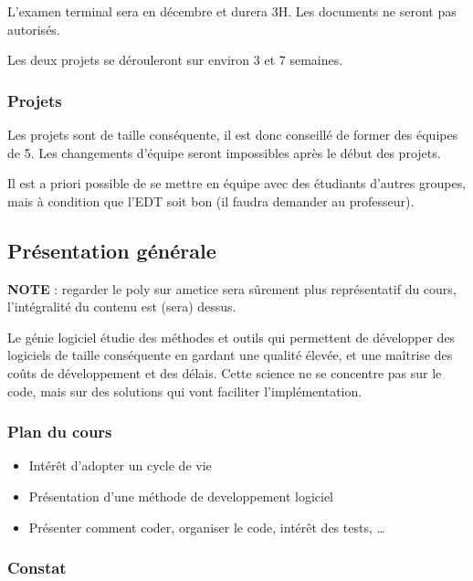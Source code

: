 L'examen terminal sera en décembre et durera 3H. Les documents ne seront
pas autorisés.

Les deux projets se dérouleront sur environ 3 et 7 semaines.

\hypertarget{projets}{%
\subsubsection{Projets}\label{projets}}

Les projets sont de taille conséquente, il est donc conseillé de former
des équipes de 5. Les changements d'équipe seront impossibles après le
début des projets.

Il est a priori possible de se mettre en équipe avec des étudiants
d'autres groupes, mais à condition que l'EDT soit bon (il faudra
demander au professeur).

\hypertarget{pruxe9sentation-guxe9nuxe9rale}{%
\subsection{Présentation
générale}\label{pruxe9sentation-guxe9nuxe9rale}}

\textbf{NOTE} : regarder le poly sur ametice sera sûrement plus
représentatif du cours, l'intégralité du contenu est (sera) dessus.

Le génie logiciel étudie des méthodes et outils qui permettent de
développer des logiciels de taille conséquente en gardant une qualité
élevée, et une maîtrise des coûts de développement et des délais. Cette
science ne se concentre pas sur le code, mais sur des solutions qui vont
faciliter l'implémentation.

\hypertarget{plan-du-cours}{%
\subsubsection{Plan du cours}\label{plan-du-cours}}

\begin{itemize}
\tightlist
\item
  Intérêt d'adopter un cycle de vie
\item
  Présentation d'une méthode de developpement logiciel
\item
  Présenter comment coder, organiser le code, intérêt des tests, \ldots{}
\end{itemize}

\hypertarget{constat}{%
\subsubsection{Constat}\label{constat}}

